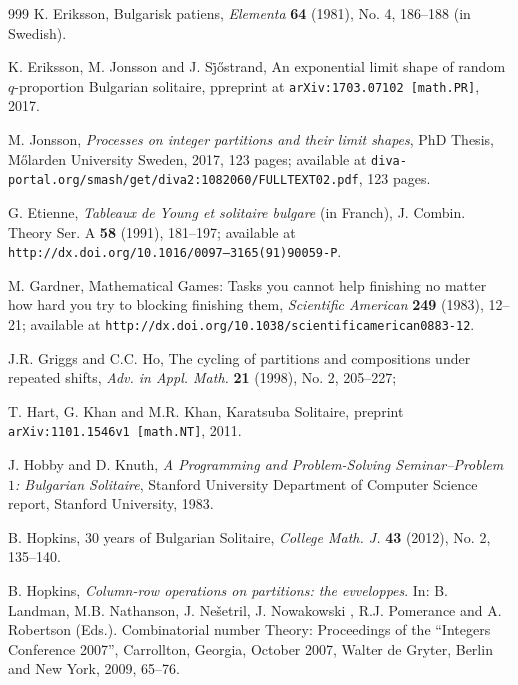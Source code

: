 \documentclass[oneside,12pt]{amsart}
\theoremstyle{definition}
\numberwithin{equation}{section}
\begin{document}
\begin{thebibliography}{999}
 K. Eriksson, Bulgarisk patiens, {\it Elementa} {\bf 64} (1981),
No. 4, 186--188 (in Swedish).

 K. Eriksson, M. Jonsson and 
J. S\.{j}\H{o}strand,    An exponential limit shape of random 
$q$-proportion Bulgarian solitaire, ppreprint at {\tt arXiv:1703.07102 [math.PR]},
2017.


 M. Jonsson, {\it Processes on integer partitions and their 
limit shapes}, PhD Thesis, M\H{o}larden University Sweden, 
2017, 123 pages; 
available at {\tt diva-portal.org/smash/get/diva2:1082060/FULLTEXT02.pdf},
123 pages.        


 G. Etienne, {\it Tableaux de Young et solitaire bulgare}
(in Franch),   J. Combin.  Theory Ser. A {\bf 58} (1991), 181--197; available at
{\tt http://dx.doi.org/10.1016/0097--3165(91)90059-P}.


  M. Gardner,  Mathematical Games: Tasks you cannot
help finishing no matter how hard you try to blocking
finishing them,  {\it Scientific American} {\bf 249} (1983), 12--21;
available at {\tt http://dx.doi.org/10.1038/scientificamerican0883-12}.

  J.R. Griggs and C.C. Ho,  The cycling of partitions and
  compositions under repeated shifts,  {\it Adv. in  Appl. Math.} {\bf 21}
  (1998), No. 2, 205--227; 


 T. Hart, G. Khan and M.R. Khan, Karatsuba Solitaire,
preprint {\tt arXiv:1101.1546v1 [math.NT]}, 2011. 

 J. Hobby and D. Knuth, {\it A Programming and Problem-Solving
Seminar--Problem $1$: Bulgarian Solitaire}, 
Stanford University Department of Computer Science report, Stanford 
University, 1983. 

 B. Hopkins, 
30 years 
of Bulgarian Solitaire, {\it College Math. J.} {\bf 43} (2012), No. 2, 
135--140.

 B. Hopkins,  {\it Column-row operations on partitions:
the evveloppes}. In: B. Landman, M.B. Nathanson, J. Ne\v{s}etril,
J. Nowakowski , R.J. Pomerance and A. Robertson (Eds.). Combinatorial
number Theory: Proceedings of the ``Integers Conference 2007'',   
Carrollton, Georgia, October 2007, Walter de Gryter, Berlin and New York,
2009, 65--76.


\end{thebibliography}
\end{document}

